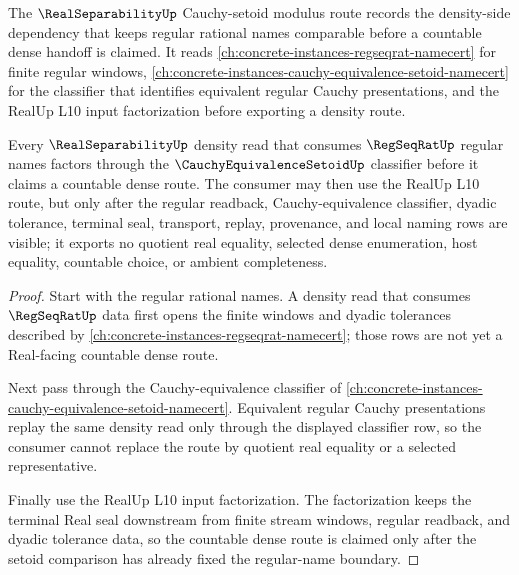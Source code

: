 The $\RealSeparabilityUp$ Cauchy-setoid modulus route records the density-side dependency that keeps regular rational names comparable before a countable dense handoff is claimed. It reads \autoref{ch:concrete-instances-regseqrat-namecert} for finite regular windows, \autoref{ch:concrete-instances-cauchy-equivalence-setoid-namecert} for the classifier that identifies equivalent regular Cauchy presentations, and the RealUp L10 input factorization before exporting a density route.

\begin{theorem}
\label{thm:real-separability-cauchy-setoid-route}
Every $\RealSeparabilityUp$ density read that consumes $\RegSeqRatUp$ regular names factors through the $\CauchyEquivalenceSetoidUp$ classifier before it claims a countable dense route. The consumer may then use the RealUp L10 route, but only after the regular readback, Cauchy-equivalence classifier, dyadic tolerance, terminal seal, transport, replay, provenance, and local naming rows are visible; it exports no quotient real equality, selected dense enumeration, host equality, countable choice, or ambient completeness.
\end{theorem}
\begin{proof}
Start with the regular rational names. A density read that consumes $\RegSeqRatUp$ data first opens the finite windows and dyadic tolerances described by \autoref{ch:concrete-instances-regseqrat-namecert}; those rows are not yet a Real-facing countable dense route.

Next pass through the Cauchy-equivalence classifier of \autoref{ch:concrete-instances-cauchy-equivalence-setoid-namecert}. Equivalent regular Cauchy presentations replay the same density read only through the displayed classifier row, so the consumer cannot replace the route by quotient real equality or a selected representative.

Finally use the RealUp L10 input factorization. The factorization keeps the terminal Real seal downstream from finite stream windows, regular readback, and dyadic tolerance data, so the countable dense route is claimed only after the setoid comparison has already fixed the regular-name boundary.
\end{proof}
